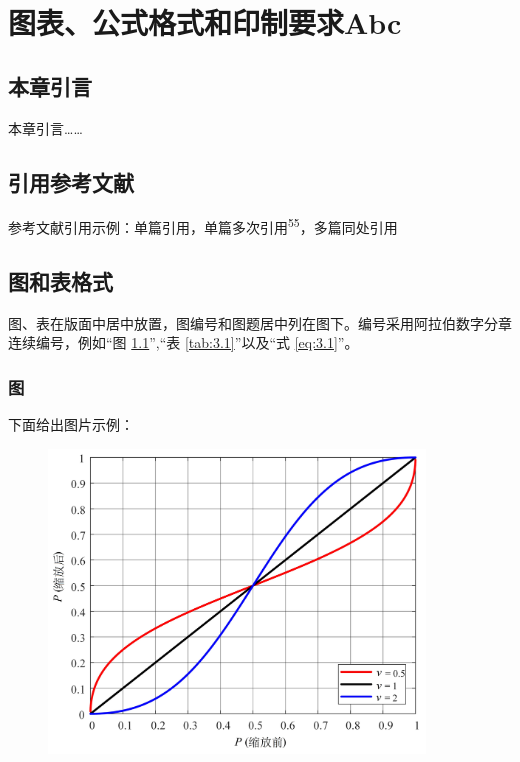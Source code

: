 

\chapter{图表、公式格式和印制要求Abc}
\thispagestyle{others}
\pagestyle{others}
\xiaosi

\section{本章引言}
本章引言……

\section{引用参考文献}
参考文献引用示例：单篇引用\textsuperscript{\cite{ref1}}，单篇多次引用\textsuperscript{\cite{ref1}55}，多篇同处引用\textsuperscript{\cite{ref1,ref2,ref3,ref13}}


\section{图和表格式}

图、表在版面中居中放置，图编号和图题居中列在图下。编号采用阿拉伯数字分章连续编号，例如“图 \ref{fig:3.1}”,“表 \ref{tab:3.1}”以及“式 \ref{eq:3.1}”。

\subsection{图}
下面给出图片示例：

\vspace{-0.1cm}

\begin{figure}[h]
		\centering 
		\includegraphics[width=10cm]{chapters/31}
	   	 \label{fig:3.1}
\end{figure}

